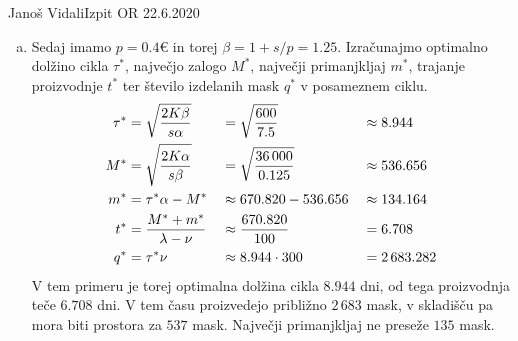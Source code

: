 \begin{naloga}{Janoš Vidali}{Izpit OR 22.6.2020}
\begin{odgovor}
\begin{enumerate}[(a)]
\item Sedaj imamo $p = 0.4 €$ in torej $\beta = 1 + s/p = 1.25$.
Izračunajmo optimalno dolžino cikla $\tau^*$,
največjo zalogo $M^*$, največji primanjkljaj $m^*$,
trajanje pro\-iz\-vod\-nje $t^*$
ter število izdelanih mask $q^*$ v posameznem ciklu.
\begin{alignat*}{3}
\tau^* &= \sqrt{2K \beta \over s \alpha}
&&= \sqrt{600 \over 7.5} &&\approx 8.944 \\
M^* &= \sqrt{2K \alpha \over s \beta}
&&= \sqrt{36\,000 \over 0.125} &&\approx 536.656 \\
m^* &= \tau^* \alpha - M^*
&&\approx 670.820 - 536.656 &&\approx 134.164 \\
t^* &= {M^* + m^* \over \lambda - \nu}
&&\approx {670.820 \over 100} &&= 6.708 \\
q^* &= \tau^* \nu
&&\approx 8.944 \cdot 300 &&= 2\,683.282
\end{alignat*}
V tem primeru je torej optimalna dolžina cikla $8.944$ dni,
od tega proizvodnja teče $6.708$ dni.
V tem času proizvedejo približno $2\,683$ mask,
v skladišču pa mora biti prostora za $537$ mask.
Največji primanjkljaj ne preseže $135$ mask.
\end{enumerate}
\end{odgovor}
\end{naloga}
